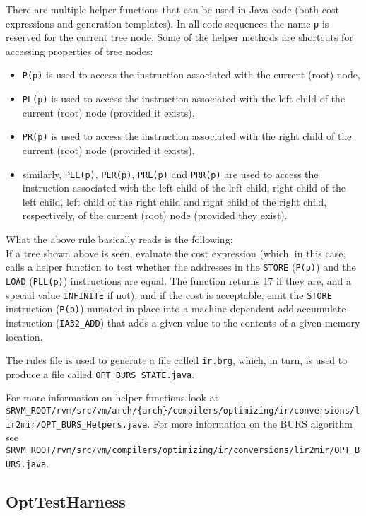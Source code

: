 There are multiple helper functions that can be used in Java code (both cost
expressions and generation templates).  In all code sequences the name
{\tt p} is reserved for the current tree node.  Some of the helper methods
are shortcuts for accessing properties of tree nodes:
\begin{itemize}
\item {\tt P(p)} is used to access the instruction associated with the
current (root) node,
\item {\tt PL(p)} is used to access the instruction associated with the left
child of the current (root) node (provided it exists),
\item {\tt PR(p)} is used to access the instruction associated with the
right child of the current (root) node (provided it exists),
\item similarly, {\tt PLL(p)}, {\tt PLR(p)}, {\tt PRL(p)} and {\tt PRR(p)}
are used to access the instruction associated with the
left child of the left child, right child of the left child, left child of
the right child and right child of the right child, respectively, of the
current (root) node (provided they exist).
\end{itemize}

What the above rule basically reads is the following:\\
If a tree shown above is seen, evaluate the cost expression (which, in this
case, calls a helper function to test whether the addresses in the
{\tt STORE} ({\tt P(p)}) and the {\tt LOAD} ({\tt PLL(p)}) instructions are
equal.  The function returns 17 if they are, and a special value
{\tt INFINITE} if not), and if the cost is acceptable, emit the {\tt STORE}
instruction ({\tt P(p)}) mutated in place into a machine-dependent
add-accumulate instruction ({\tt IA32\_ADD}) that adds a given value to the
contents of a given memory location.

The rules file is used to generate a file called {\tt ir.brg}, which, in
turn, is used to produce a file called {\tt OPT\_BURS\_STATE.java}.

For more information on helper functions look at
{\tt \$RVM\_ROOT/rvm/src/\-vm/\-arch/\-\{arch\}/com\-pi\-l\-ers/op\-ti\-mi\-z\-ing/ir/conver\-sions/lir2\-mir/OPT\_BURS\_Helpers.java}.
For more information on the BURS algorithm see
{\tt \$RVM\_ROOT/rvm/src/vm/compi\-l\-ers/op\-ti\-m\-i\-zing/ir/conver\-sions/lir2\-mir/OPT\_BURS.java}.

\subsection{OptTestHarness}\label{opttestharness}

